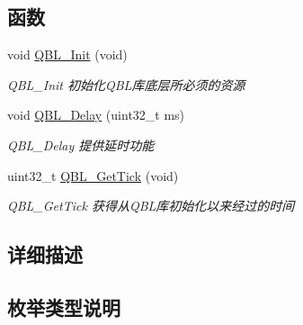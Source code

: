 \subsection*{函数}
\begin{DoxyCompactItemize}
\item 
void \hyperlink{group__qbl_ga858dcf3f31fab8564b15f7e3c6243d52}{Q\+B\+L\+\_\+\+Init} (void)\hypertarget{group__qbl_ga858dcf3f31fab8564b15f7e3c6243d52}{}\label{group__qbl_ga858dcf3f31fab8564b15f7e3c6243d52}

\begin{DoxyCompactList}\small\item\em Q\+B\+L\+\_\+\+Init 初始化\+Q\+B\+L库底层所必须的资源 \end{DoxyCompactList}\item 
void \hyperlink{group__qbl_gaaf84ff18d32c89b14e2656aad43782ad}{Q\+B\+L\+\_\+\+Delay} (uint32\+\_\+t ms)
\begin{DoxyCompactList}\small\item\em Q\+B\+L\+\_\+\+Delay 提供延时功能 \end{DoxyCompactList}\item 
uint32\+\_\+t \hyperlink{group__qbl_ga122e365feec2021d766484e0ba08dbb7}{Q\+B\+L\+\_\+\+Get\+Tick} (void)
\begin{DoxyCompactList}\small\item\em Q\+B\+L\+\_\+\+Get\+Tick 获得从\+Q\+B\+L库初始化以来经过的时间 \end{DoxyCompactList}\end{DoxyCompactItemize}


\subsection{详细描述}


\subsection{枚举类型说明}
